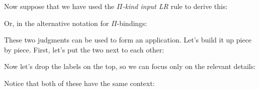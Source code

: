 \documentclass{book}
\numberwithin{equation}{chapter}
\begin{document}
\noindent
Now suppose that we have used the \textit{$\Pi$-kind input LR} rule to derive this:

\begin{prooftree}
\end{prooftree}

\noindent
Or, in the alternative notation for $\Pi$-bindings:

\begin{prooftree}
\end{prooftree}

\noindent
These two judgments can be used to form an application. Let's build it up piece by piece. First, let's put the two next to each other:

\begin{prooftree}


\end{prooftree}

\noindent
Now let's drop the labels on the top, so we can focus only on the relevant details:

\begin{prooftree}


\end{prooftree}

\noindent
Notice that both of these have the same context:

\begin{prooftree}


\end{prooftree}
\end{document}
